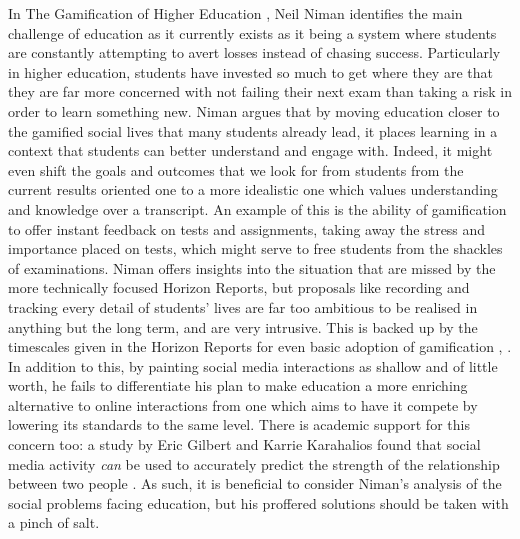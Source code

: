 \documentclass[12pt,a4paper,twoside]{report}
\begin{document}
In The Gamification of Higher Education \cite{niman2014gamification}, Neil Niman identifies the main challenge of education as it currently exists as it being a system where students are constantly attempting to avert losses instead of chasing success. Particularly in higher education, students have invested so much to get where they are that they are far more concerned with not failing their next exam than taking a risk in order to learn something new. Niman argues that by moving education closer to the gamified social lives that many students already lead, it places learning in a context that students can better understand and engage with. Indeed, it might even shift the goals and outcomes that we look for from students from the current results oriented one to a more idealistic one which values understanding and knowledge over a transcript. An example of this is the ability of gamification to offer instant feedback on tests and assignments, taking away the stress and importance placed on tests, which might serve to free students from the shackles of examinations. Niman offers insights into the situation that are missed by the more technically focused Horizon Reports, but proposals like recording and tracking every detail of students' lives are far too ambitious to be realised in anything but the long term, and are very intrusive. This is backed up by the timescales given in the Horizon Reports for even basic adoption of gamification \cite{johnson2013nmc}, \cite{johnson2014nmc}. In addition to this, by painting social media interactions as shallow and of little worth, he fails to differentiate his plan to make education a more enriching alternative to online interactions from one which aims to have it compete by lowering its standards to the same level. There is academic support for this concern too: a study by Eric Gilbert and Karrie Karahalios found that social media activity \textit{can} be used to accurately predict the strength of the relationship between two people \cite{gilbert2009predicting}. As such, it is beneficial to consider Niman's analysis of the social problems facing education, but his proffered solutions should be taken with a pinch of salt.
\end{document}
